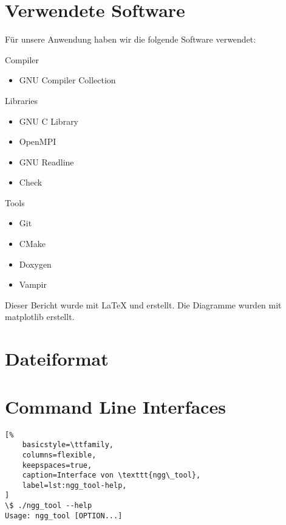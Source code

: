 \begin{appendices}

\section{Verwendete Software}

Für unsere Anwendung haben wir die folgende Software verwendet:

Compiler
\begin{itemize}
    \item GNU Compiler Collection \cite{gcc}
\end{itemize}

Libraries
\begin{itemize}
    \item GNU C Library \cite{glibc}
    \item OpenMPI \cite{openmpi}
    \item GNU Readline \cite{readline}
    \item Check \cite{check}
\end{itemize}

Tools
\begin{itemize}
    \item Git \cite{git}
    \item CMake \cite{cmake}
    \item Doxygen \cite{doxygen}
    \item Vampir \cite{vampir}
\end{itemize}

Dieser Bericht wurde mit {\LaTeX} und {\KOMAScript} erstellt. Die Diagramme
wurden mit matplotlib \cite{matplotlib} erstellt.

\section{Dateiformat}




\section{Command Line Interfaces}

\begin{lstlisting}[%
    basicstyle=\ttfamily,
    columns=flexible,
    keepspaces=true,
    caption=Interface von \texttt{ngg\_tool},
    label=lst:ngg_tool-help,
]
\$ ./ngg_tool --help
Usage: ngg_tool [OPTION...]


\end{lstlisting}
\end{appendices}
